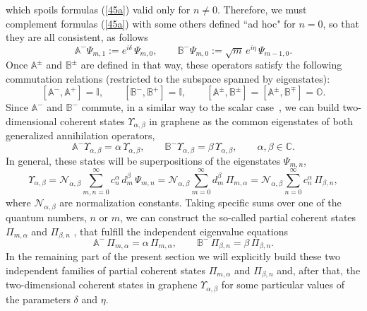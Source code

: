 \documentclass[aps,showpacs,showkeys]{revtex4}
\begin{document}
which spoils formulas (\ref{45a}) valid only for $n\neq0$. Therefore, we must complement formulas (\ref{45a}) with some others defined ``ad hoc" for $n=0$, so that they are all consistent, as follows
\begin{equation}\label{47a}
\mathbb{A}^{-}\Psi_{m,1}:=e^{i\delta}\, \Psi_{m,0}, \qquad \mathbb{B}^{-}\Psi_{m,0}:=\sqrt{m}\, e^{i\eta}\, \Psi_{m-1,0}.
\end{equation}
Once  $\mathbb{A}^{\pm}$ and $\mathbb{B}^{\pm}$ are defined in that way, these operators satisfy the following commutation relations (restricted to the subspace spanned by eigenstates):
 	\begin{equation}
	\left[\mathbb{A}^-,\mathbb{A}^+\right]=\mathbb{I}, \qquad
	\left[\mathbb{B}^-,\mathbb{B}^+\right]=\mathbb{I}, \qquad
	\left[\mathbb{A}^\pm,\mathbb{B}^\pm\right]=[\mathbb{A}^\pm,\mathbb{B}^\mp]= \mathbb{O}. \label{42c}
	\end{equation}
Since $\mathbb{A}^{-}$ and $\mathbb{B}^{-}$ commute, in a similar way to the scalar case~\cite{mm69,d17,dknn17}, we can build two-dimensional coherent states $\Upsilon_{\alpha,\beta}$ in graphene as the common eigenstates of both generalized annihilation operators,
\begin{equation}\label{43}
\mathbb{A}^- \Upsilon_{\alpha,\beta}=\alpha\, \Upsilon_{\alpha,\beta}, 
\qquad \mathbb{B}^- \Upsilon_{\alpha,\beta}=\beta\, \Upsilon_{\alpha,\beta}, 
\qquad \alpha,\beta\in\mathbb{C}.
\end{equation}
In general, these states will be superpositions of the eigenstates $\Psi_{m,n}$,
\begin{equation}\label{44}
\Upsilon_{\alpha,\beta}=\mathcal{N}_{\alpha,\beta}\sum_{m,n=0}^{\infty}c_n^\alpha \,d_m^\beta\, \Psi_{m,n}=\mathcal{N}_{\alpha,\beta} \sum_{m=0}^{\infty}d_m^\beta\, {\Pi_{m,\alpha}}=\mathcal{N}_{\alpha,\beta} \sum_{n=0}^{\infty}c_n^\alpha\, \Pi_{\beta,n},
\end{equation}
where $\mathcal{N}_{\alpha,\beta}$ are normalization constants. Taking specific sums over one of the quantum numbers, $n$ or $m$, we can construct the so-called partial coherent states $\Pi_{m,\alpha}$ and $\Pi_{\beta,n}$ \cite{mm69}, that fulfill the independent eigenvalue equations
\begin{equation}\label{45}
\mathbb{A}^-\, \Pi_{m,\alpha}=\alpha\, \Pi_{m,\alpha}, \qquad 
\mathbb{B}^-\, \Pi_{\beta,n}=\beta\, \Pi_{\beta,n}.
\end{equation}
In the remaining part of the present section we will explicitly build these two independent families of partial coherent states $\Pi_{m,\alpha}$ and $\Pi_{\beta,n}$ and, after that, the two-dimensional coherent states in graphene $\Upsilon_{\alpha,\beta}$ for some particular values of the parameters $\delta$ and $\eta$.
\end{document}
